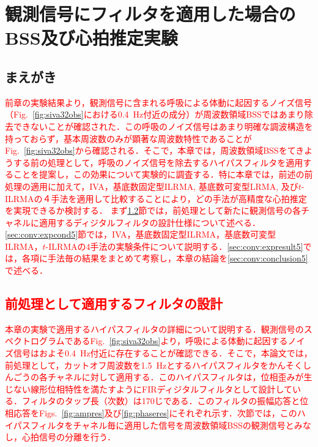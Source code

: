\chapter{観測信号にフィルタを適用した場合のBSS及び心拍推定実験}
\label{chap:fbsshrexp}

\section{まえがき}
\textcolor{red}{前章の実験結果より，観測信号に含まれる呼吸による体動に起因するノイズ信号（Fig.~\ref{fig:siva32obs}における0.4~Hz付近の成分）が周波数領域BSSではあまり除去できないことが確認された．この呼吸のノイズ信号はあまり明確な調波構造を持っておらず，基本周波数のみが顕著な周波数特性であることがFig.~\ref{fig:siva32obs}から確認される．そこで，本章では，周波数領域BSSをてきようする前の処理として，呼吸のノイズ信号を除去するハイパスフィルタを適用することを提案し，この効果について実験的に調査する．特に本章では，前述の前処理の適用に加えて，IVA，基底数固定型ILRMA, 基底数可変型LRMA, 及び$t$-ILRMAの４手法を適用して比較することにより，どの手法が高精度な心拍推定を実現できるか検討する．
まず\ref{sec:conv:filteroutline}節では，前処理として新たに観測信号の各チャネルに適用するディジタルフィルタの設計仕様について述べる．\ref{sec:conv:expcond5}節では，IVA，基底数固定型ILRMA，基底数可変型ILRMA，$t$-ILRMAの4手法の実験条件について説明する．\ref{sec:conv:expresult5}では，各項に手法毎の結果をまとめて考察し，本章の結論を\ref{sec:conv:conclusion5}で述べる．}

\section{\textcolor{red}{前処理として適用するフィルタの設計}}
\label{sec:conv:filteroutline}
\textcolor{red}{本章の実験で適用するハイパスフィルタの詳細について説明する．観測信号のスペクトログラムであるFig.~\ref{fig:siva32obs}より，呼吸による体動に起因するノイズ信号はおよそ0.4~Hz付近に存在することが確認できる．そこで，本論文では，前処理として，カットオフ周波数を1.5~Hzとするハイパスフィルタをかんそくしんごうの各チャネルに対して適用する．このハイパスフィルタは，位相歪みが生じない線形位相特性を満たすようにFIRディジタルフィルタとして設計している．フィルタのタップ長（次数）は170じである．このフィルタの振幅応答と位相応答をFigs.~\ref{fig:ampres}及び\ref{fig:phaseres}にそれぞれ示す．次節では，このハイパスフィルタをチャネル毎に適用した信号を周波数領域BSSの観測信号とみなし，心拍信号の分離を行う．}

